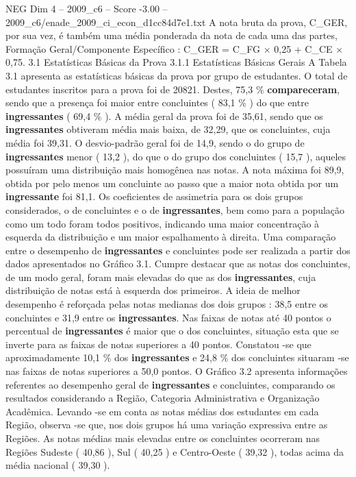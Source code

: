 \begin{textsample}{NEG Dim 4 – 2009\_c6 – Score -3.00 – 2009\_c6/enade\_2009\_ci\_econ\_d1cc84d7e1.txt}
A nota bruta da prova, C\_GER, por sua vez, é também uma média ponderada da nota de cada uma das partes, Formação Geral/Componente Específico : C\_GER = C\_FG × 0,25 + C\_CE × 0,75. 3.1 Estatísticas Básicas da Prova 3.1.1 Estatísticas Básicas Gerais A Tabela 3.1 apresenta as estatísticas básicas da prova por grupo de estudantes.
O total de estudantes inscritos para a prova foi de 20821.
Destes, 75,3 \% \textbf{compareceram}, sendo que a presença foi maior entre concluintes ( 83,1 \% ) do que entre \textbf{ingressantes} ( 69,4 \% ).
A média geral da prova foi de 35,61, sendo que os \textbf{ingressantes} obtiveram média mais baixa, de 32,29, que os concluintes, cuja média foi 39,31.
O desvio-padrão geral foi de 14,9, sendo o do grupo de \textbf{ingressantes} menor ( 13,2 ), do que o do grupo dos concluintes ( 15,7 ), aqueles possuíram uma distribuição mais homogênea nas notas.
A nota máxima foi 89,9, obtida por pelo menos um concluinte ao passo que a maior nota obtida por um \textbf{ingressante} foi 81,1.
Os coeficientes de assimetria para os dois grupos considerados, o de concluintes e o de \textbf{ingressantes}, bem como para a população como um todo foram todos positivos, indicando uma maior concentração à esquerda da distribuição e um maior espalhamento à direita.
Uma comparação entre o desempenho de \textbf{ingressantes} e concluintes pode ser realizada a partir dos dados apresentados no Gráfico 3.1.
Cumpre destacar que as notas dos concluintes, de um modo geral, foram mais elevadas do que as dos \textbf{ingressantes}, cuja distribuição de notas está à esquerda dos primeiros.
A ideia de melhor desempenho é reforçada pelas notas medianas dos dois grupos : 38,5 entre os concluintes e 31,9 entre os \textbf{ingressantes}.
Nas faixas de notas até 40 pontos o percentual de \textbf{ingressantes} é maior que o dos concluintes, situação esta que se inverte para as faixas de notas superiores a 40 pontos.
Constatou -se que aproximadamente 10,1 \% dos \textbf{ingressantes} e 24,8 \% dos concluintes situaram -se nas faixas de notas superiores a 50,0 pontos.
O Gráfico 3.2 apresenta informações referentes ao desempenho geral de \textbf{ingressantes} e concluintes, comparando os resultados considerando a Região, Categoria Administrativa e Organização Acadêmica.
Levando -se em conta as notas médias dos estudantes em cada Região, observa -se que, nos dois grupos há uma variação expressiva entre as Regiões.
As notas médias mais elevadas entre os concluintes ocorreram nas Regiões Sudeste ( 40,86 ), Sul ( 40,25 ) e Centro-Oeste ( 39,32 ), todas acima da média nacional ( 39,30 ).

\end{textsample}
